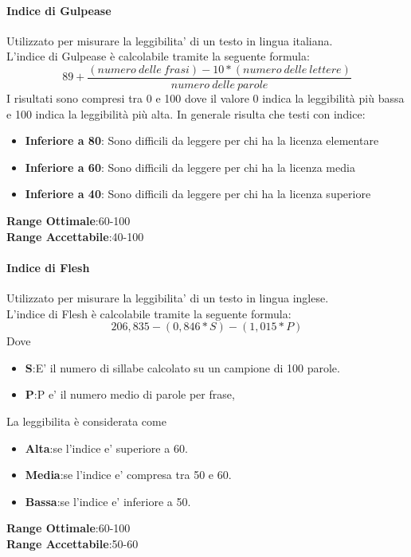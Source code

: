 \paragraph{Indice di Gulpease}
\begin{flushleft}
Utilizzato per misurare la leggibilita' di un testo in lingua italiana.\\
L'indice di Gulpease è calcolabile tramite la seguente formula:
$$
	89+\frac{(numero\:delle\:frasi)-10*(numero\:delle\:lettere)}{numero\:delle\:parole}
$$
I risultati sono compresi tra 0 e 100 dove il valore 0 indica la leggibilità più bassa e 100 indica la leggibilità più alta. In generale risulta che testi con indice:
	\begin{itemize}
		\item{\textbf{Inferiore	a 80}}: Sono difficili da leggere per chi ha la licenza elementare
		\item{\textbf{Inferiore	a 60}}: Sono difficili da leggere per chi ha la licenza media
		\item{\textbf{Inferiore	a 40}}: Sono difficili da leggere per chi ha la licenza superiore
	\end{itemize}
\textbf{Range Ottimale}:60-100 \\
\textbf{Range Accettabile}:40-100
\end{flushleft}
\paragraph{Indice di Flesh}
\begin{flushleft}
Utilizzato per misurare la leggibilita' di un testo in lingua inglese.\\
L'indice di Flesh è calcolabile tramite la seguente formula:
	$$
		206,835-(0,846*S)-(1,015*P)
	$$
Dove
	\begin{itemize}
		\item{\textbf{S}}:E' il numero di sillabe calcolato su un campione di 100 parole.
		\item{\textbf{P}}:P e' il numero medio di parole per frase,
	\end{itemize}
La leggibilita è considerata come
	\begin{itemize}
		\item{\textbf{Alta}}:se l'indice e' superiore a 60.
		\item{\textbf{Media}}:se l'indice e' compresa tra 50 e 60.
		\item{\textbf{Bassa}}:se l'indice e' inferiore a 50.
	\end{itemize}
\textbf{Range Ottimale}:60-100 \\
\textbf{Range Accettabile}:50-60
\end{flushleft}
\pagebreak
